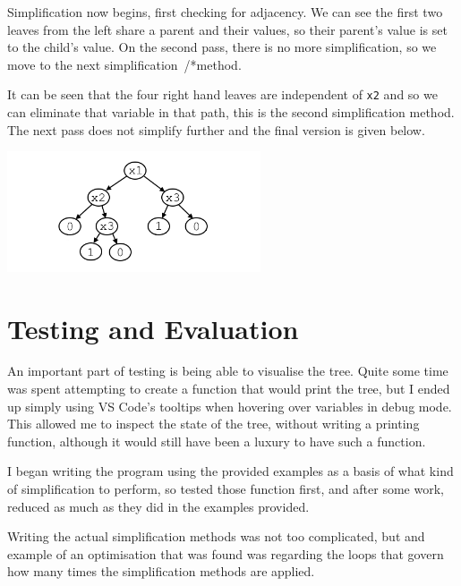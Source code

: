 \documentclass[12pt]{article}
\begin{document}
    Simplification now begins, first checking for adjacency. We can see the first two leaves from the left share a parent and their values, so their parent's value is set to the child's value. On the second pass, there is no more simplification, so we move to the next simplification~/*method.

    It can be seen that the four right hand leaves are independent of \texttt{x2} and so we can eliminate that variable in that path, this is the second simplification method. The next pass does not simplify further and the final version is given below.
    \begin{center} \vspace{-3ex}
        \includegraphics[width=7.5cm, interpolate]{rsc/bt4.png}
        \parbox{\linewidth}{}
    \end{center}

    \newpage

    \section{Testing and Evaluation} \vspace{-3ex}
    An important part of testing is being able to visualise the tree. Quite some time was spent attempting to create a function that would print the tree, but I ended up simply using VS Code's tooltips when hovering over variables in debug mode. This allowed me to inspect the state of the tree, without writing a printing function, although it would still have been a luxury to have such a function.

    I began writing the program using the provided examples as a basis of what kind of simplification to perform, so tested those function first, and after some work, reduced as much as they did in the examples provided.

    Writing the actual simplification methods was not too complicated, but and example of an optimisation that was found was regarding the loops that govern how many times the simplification methods are applied.
\end{document}
